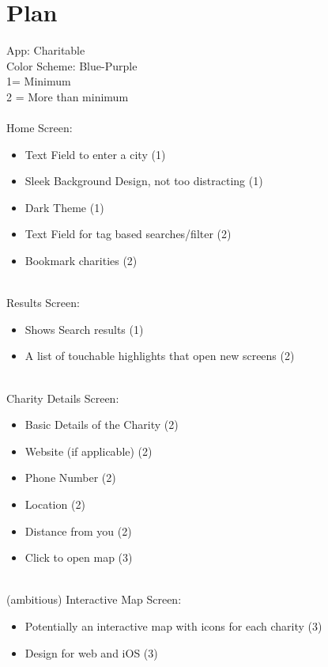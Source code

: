 \documentclass{article}
\begin{document}
\section{Plan}
App: Charitable \\
Color Scheme: Blue-Purple\\
1= Minimum \\
2 = More than minimum \\
\\
Home Screen:
\begin{itemize}
    \item Text Field to enter a city (1)
    \item Sleek Background Design, not too distracting (1)
    \item Dark Theme (1)
    \item Text Field for tag based searches/filter (2)
    \item Bookmark charities (2)
\end{itemize}
\\
Results Screen:
\begin{itemize}
    \item Shows Search results (1)
    \item A list of touchable highlights that open new screens (2)
\end{itemize}
\\
Charity Details Screen:
\begin{itemize}
    \item Basic Details of the Charity (2)
    \item Website (if applicable) (2)
    \item Phone Number  (2)
    \item Location (2)
    \item Distance from you (2)
    \item Click to open map (3)
\end{itemize}
\\
(ambitious) Interactive Map Screen:
\begin{itemize}
    \item Potentially an interactive map with icons for each charity (3)
    \item Design for web and iOS (3)
\end{itemize}
\end{document}
